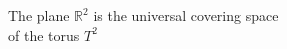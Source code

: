 \documentclass[preview]{standalone}
\begin{document}
\begin{center}
The plane $\mathbb{R}^2$ is the universal covering space\\of the torus $T^2$
\end{center}
\end{document}
